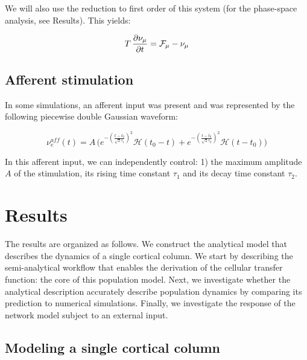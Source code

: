 \documentclass[8pt, colorlinks, a4paper]{article}
\begin{document}
We will also use the reduction to first order of this system (for the
phase-space analysis, see Results). This yields:

\begin{equation}
\label{eq:master-eq-1st-order}
T \, \frac{\partial \nu_\mu}{\partial t} = \mathcal{F}_\mu - \nu_\mu \\
\end{equation}

\subsection{Afferent stimulation}
\label{sec-3-8}

In some simulations, an afferent input was present and was represented
by the following piecewise double Gaussian waveform:

\begin{equation}
\label{eq:input}
\nu_e^{aff}(t) = A \, \Big(
e^{-(\frac{t-t_0}{\sqrt{2} \tau_1})^2} \mathcal{H}(t_0-t)+
e^{-(\frac{t-t_0}{\sqrt{2} \tau_2})^2} \mathcal{H}(t-t_0)
\Big)
\end{equation}

In this afferent input, we can independently control: 1) the maximum
amplitude \(A\) of the stimulation, its rising time constant
\(\tau_1\) and its decay time constant \(\tau_2\).


\section{Results}
\label{sec-4}
\normalsize

The results are organized as follows. We construct the analytical
model that describes the dynamics of a single cortical column. We
start by describing the semi-analytical workflow that enables the
derivation of the cellular transfer function: the core of this
population model. Next, we investigate whether the analytical
description accurately describe population dynamics by comparing its
prediction to numerical simulations. Finally, we investigate the
response of the network model subject to an external input.

\subsection{Modeling a single cortical column}
\label{sec-4-1}
\end{document}
